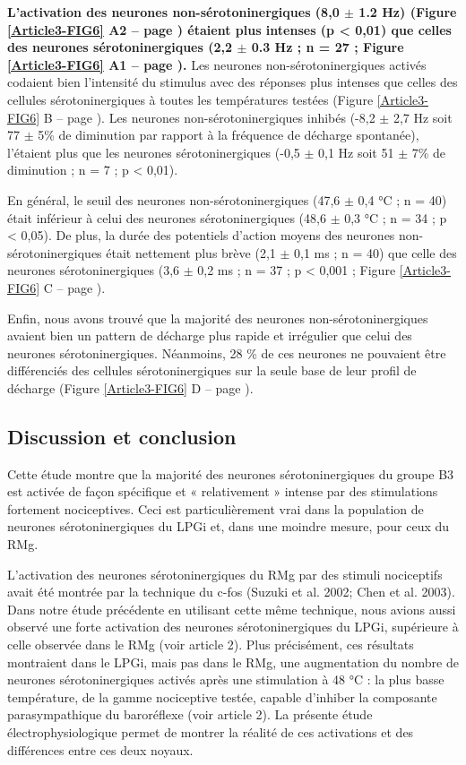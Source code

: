 \documentclass[a4paper,12pt,twoside]{report}
\begin{document}
\textbf{L’activation des neurones non-sérotoninergiques (8,0 $\pm$ 1.2 Hz) (Figure \ref{Article3-FIG6} A2 – page \pageref{Article3-FIG6}) étaient plus intenses (p < 0,01) que celles des neurones sérotoninergiques (2,2 $\pm$ 0.3 Hz ; n = 27 ; Figure \ref{Article3-FIG6} A1 – page \pageref{Article3-FIG6}).} Les neurones non-sérotoninergiques activés codaient bien l’intensité du stimulus avec des réponses plus intenses que celles des cellules sérotoninergiques à toutes les températures testées (Figure \ref{Article3-FIG6} B – page \pageref{Article3-FIG6}). Les neurones non-sérotoninergiques inhibés (-8,2 $\pm$ 2,7 Hz soit 77 $\pm$ 5\% de diminution par rapport à la fréquence de décharge spontanée), l’étaient plus que les neurones sérotoninergiques (-0,5 $\pm$ 0,1 Hz soit 51 $\pm$ 7\% de diminution ; n = 7 ; p < 0,01). 

En général, le seuil des neurones non-sérotoninergiques (47,6 $\pm$ 0,4 °C ; n = 40) était inférieur à celui des neurones sérotoninergiques (48,6 $\pm$ 0,3 °C ; n = 34 ; p < 0,05). De plus, la durée des potentiels d’action moyens des neurones non-sérotoninergiques était nettement plus brève (2,1 $\pm$ 0,1 ms ; n = 40) que celle des neurones sérotoninergiques (3,6 $\pm$ 0,2 ms ; n = 37 ; p < 0,001 ; Figure \ref{Article3-FIG6} C – page \pageref{Article3-FIG6}). 

Enfin, nous avons trouvé que la majorité des neurones non-sérotoninergiques avaient bien un pattern de décharge plus rapide et irrégulier que celui des neurones sérotoninergiques. Néanmoins, 28 \% de ces neurones ne pouvaient être différenciés des cellules sérotoninergiques sur la seule base de leur profil de décharge (Figure \ref{Article3-FIG6} D – page \pageref{Article3-FIG6}).

\subsection{Discussion et conclusion}

Cette étude montre que la majorité des neurones sérotoninergiques du groupe B3 est activée de façon spécifique et « relativement » intense par des stimulations fortement nociceptives. Ceci est particulièrement vrai dans la population de neurones sérotoninergiques du LPGi et, dans une moindre mesure, pour ceux du RMg. 

L’activation des neurones sérotoninergiques du RMg par des stimuli nociceptifs avait été montrée par la technique du c-fos (Suzuki et al. 2002; Chen et al. 2003). Dans notre étude précédente en utilisant cette même technique, nous avions aussi observé une forte activation des neurones sérotoninergiques du LPGi, supérieure à celle observée dans le RMg (voir article 2). Plus précisément, ces résultats montraient dans le LPGi, mais pas dans le RMg, une augmentation du nombre de neurones sérotoninergiques activés après une stimulation à 48 °C : la plus basse température, de la gamme nociceptive testée, capable d’inhiber la composante parasympathique du baroréflexe (voir article 2). La présente étude électrophysiologique permet de montrer la réalité de ces activations et des différences entre ces deux noyaux.
\end{document}
